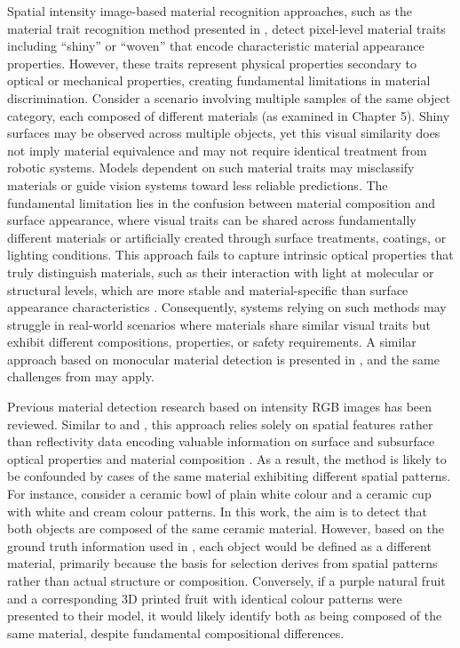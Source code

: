\documentclass[12pt,a4paper,oneside]{report}
\begin{document}
Spatial intensity image-based material recognition approaches, such as the material trait recognition method presented in \cite{schwartz2013}, detect pixel-level material traits including ``shiny'' or ``woven'' that encode characteristic material appearance properties. However, these traits represent physical properties secondary to optical or mechanical properties, creating fundamental limitations in material discrimination. Consider a scenario involving multiple samples of the same object category, each composed of different materials (as examined in Chapter 5). Shiny surfaces may be observed across multiple objects, yet this visual similarity does not imply material equivalence and may not require identical treatment from robotic systems. Models dependent on such material traits may misclassify materials or guide vision systems toward less reliable predictions. The fundamental limitation lies in the confusion between material composition and surface appearance, where visual traits can be shared across fundamentally different materials or artificially created through surface treatments, coatings, or lighting conditions. This approach fails to capture intrinsic optical properties that truly distinguish materials, such as their interaction with light at molecular or structural levels, which are more stable and material-specific than surface appearance characteristics \cite{elachi2021,bass2010,su2016}. Consequently, systems relying on such methods may struggle in real-world scenarios where materials share similar visual traits but exhibit different compositions, properties, or safety requirements. A similar approach based on monocular material detection is presented in \cite{depthpro2024}, and the same challenges from \cite{schwartz2013} may apply.

Previous material detection research based on intensity RGB images \cite{sharan2013} has been reviewed. Similar to \cite{schwartz2013} and \cite{depthpro2024}, this approach relies solely on spatial features rather than reflectivity data encoding valuable information on surface and subsurface optical properties and material composition \cite{su2016,becker2023}. As a result, the method is likely to be confounded by cases of the same material exhibiting different spatial patterns. For instance, consider a ceramic bowl of plain white colour and a ceramic cup with white and cream colour patterns. In this work, the aim is to detect that both objects are composed of the same ceramic material. However, based on the ground truth information used in \cite{sharan2013}, each object would be defined as a different material, primarily because the basis for selection derives from spatial patterns rather than actual structure or composition. Conversely, if a purple natural fruit and a corresponding 3D printed fruit with identical colour patterns were presented to their model, it would likely identify both as being composed of the same material, despite fundamental compositional differences.
\end{document}
